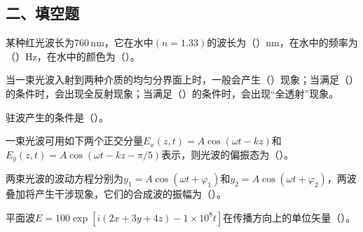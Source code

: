 \documentclass[padl, analysis, notocnum]{ExBook}
\newcommand{\answerarea}[1][3.5cm]{%
  \par\vspace{1mm}%
  \noindent{\color{themeColor!35}\rule{\linewidth}{0.4pt}}\par
  \noindent\begin{minipage}[t][#1][t]{\linewidth}\vspace{0pt}\end{minipage}\par
  \noindent{\color{themeColor!35}\rule{\linewidth}{0.4pt}}\par
}
\begin{document}
\subsection{二、填空题}
\begin{qitems}[startnum=1]
\qitem 某种红光波长为$760\,\mathrm{nm}$，它在水中$(n=1.33)$的波长为（\hspace{1.6em}）nm，在水中的频率为（\hspace{1.6em}）Hz，在水中的颜色为（\hspace{1.6em}）。
\label{q:185:start}
\answerarea[4.0cm]
\label{q:185:end}
\end{qitems}

\begin{qitems}[startnum=2]
\qitem 当一束光波入射到两种介质的均匀分界面上时，一般会产生（\hspace{1.6em}）现象；当满足（\hspace{1.6em}）的条件时，会出现全反射现象；当满足（\hspace{1.6em}）的条件时，会出现“全透射”现象。
\label{q:186:start}
\answerarea[4.0cm]
\label{q:186:end}
\end{qitems}

\begin{qitems}[startnum=3]
\qitem 驻波产生的条件是（\hspace{1.6em}）。
\label{q:187:start}
\answerarea[4.0cm]
\label{q:187:end}
\end{qitems}

\begin{qitems}[startnum=4]
\qitem 一束光波可用如下两个正交分量$E_{x}(z,t)=A\cos (\omega t-kz)$和$E_{y}(z,t)=A\cos (\omega t-kz-\pi /5)$表示，则光波的偏振态为（\hspace{1.6em}）。
\label{q:188:start}
\answerarea[4.0cm]
\label{q:188:end}
\end{qitems}

\begin{qitems}[startnum=5]
\qitem 两束光波的波动方程分别为$y_{1}=A\cos (\omega t+\varphi_{1})$和$y_{2}=A\cos (\omega t+\varphi_{2})$，两波叠加将产生干涉现象，它们的合成波的振幅为（\hspace{1.6em}）。
\label{q:189:start}
\answerarea[4.0cm]
\label{q:189:end}
\end{qitems}

\begin{qitems}[startnum=6]
\qitem 平面波$E=100\exp [i(2x+3y+4z)-1\times 10^{8}t]$在传播方向上的单位矢量（\hspace{1.6em}）。
\label{q:190:start}
\answerarea[4.0cm]
\label{q:190:end}
\end{qitems}
\end{document}
